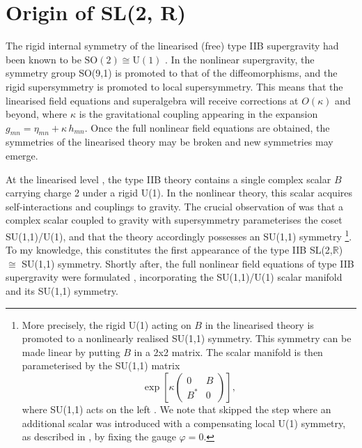 



\section{Origin of SL(2, R)}

The rigid internal symmetry of the linearised (free) type IIB supergravity had been known to be $\mathrm{SO}(2) \cong \mathrm{U}(1)$ \cite{Nahm:1977tg,Green:1982tk}.
In the nonlinear supergravity, the symmetry group SO(9,1) is promoted to that of the diffeomorphisms, and the rigid supersymmetry is promoted to local supersymmetry.
This means that the linearised field equations and superalgebra will receive corrections at $O(\kappa)$ and beyond, where $\kappa$ is the gravitational coupling appearing in the expansion $g_{mn} = \eta_{mn} + \kappa\, h_{mn}$.
Once the full nonlinear field equations are obtained, the symmetries of the linearised theory may be broken and new symmetries may emerge.

At the linearised level \cite{Green:1982tk}, the type IIB theory contains a single complex scalar $B$ carrying charge 2 under a rigid U(1).
In the nonlinear theory, this scalar acquires self-interactions and couplings to gravity.
The crucial observation of \cite{Schwarz:1983wa} was that a complex scalar coupled to gravity with supersymmetry parameterises the coset SU(1,1)/U(1), and that the theory accordingly possesses an SU(1,1) symmetry%
\footnote{
More precisely, the rigid U(1) acting on $B$ in the linearised theory is promoted to a nonlinearly realised SU(1,1) symmetry. This symmetry can be made linear by putting $B$ in a 2x2 matrix.
The scalar manifold is then parameterised by the SU(1,1) matrix
\begin{equation}
\exp{
\left[
\kappa
\begin{pmatrix}
    0 & B \\ B^* & 0
\end{pmatrix}
\right]
},
\end{equation}
where SU(1,1) acts on the left \cite{Schwarz:1983wa}. We note that skipped the step where an additional scalar was introduced with a compensating local U(1) symmetry, as described in \cite{Schwarz:1983wa}, by fixing the gauge $\varphi = 0$.
}.
To my knowledge, this constitutes the first appearance of the type IIB SL(2,$\mathbb{R}$) $\cong$ SU(1,1) symmetry.
Shortly after, the full nonlinear field equations of type IIB supergravity were formulated \cite{Schwarz:1983qr,Howe:1983sra}, incorporating the SU(1,1)/U(1) scalar manifold and its SU(1,1) symmetry.

